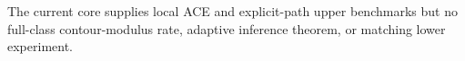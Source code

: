 The current core supplies local ACE and explicit-path upper benchmarks but no full-class contour-modulus rate, adaptive inference theorem, or matching lower experiment.
